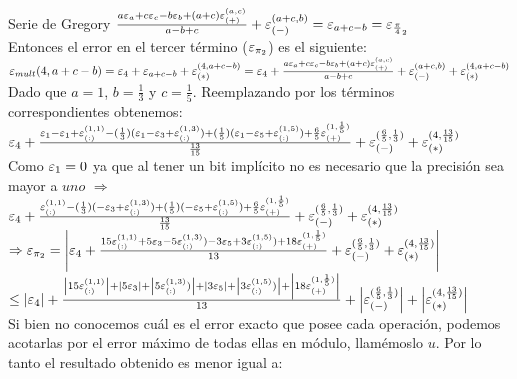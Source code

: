 \begin{subsubsection}{Serie de Gregory}
	$\frac{a\varepsilon _{a} + c\varepsilon _{c} - b\varepsilon _{b} + (a+c)\varepsilon _{({+})}^{({a,c})}}{a-b+c} + \varepsilon _{({-})}^{({a+c,b})} = \varepsilon _{a+c-b} = \varepsilon _{\frac{\pi}{4}_2}$\\
	
	Entonces el error en el tercer término ($\varepsilon _{\pi_2}$) es el siguiente:\\
	
	$\varepsilon _{mult}({4,a+c-b}) = \varepsilon _{4} + \varepsilon _{a+c-b} + \varepsilon _{({*})}^{({4,a+c-b})} = \varepsilon _{4} + \frac{a\varepsilon _{a} + c\varepsilon _{c} - b\varepsilon _{b} + (a+c)\varepsilon _{({+})}^{({a,c})}}{a-b+c} + \varepsilon _{({-})}^{({a+c,b})} + \varepsilon _{({*})}^{({4,a+c-b})}$\\
	
	Dado que $a=1$, $b=\frac{1}{3}$ y $c=\frac{1}{5}$. Reemplazando por los términos\\
	correspondientes obtenemos:\\
	
	$\varepsilon _{4} + \frac{\varepsilon _{1} - \varepsilon _{1} + \varepsilon _{({:})}^{({1,1})} - (\frac{1}{3})(\varepsilon _{1} - \varepsilon _{3} + \varepsilon _{({:})}^{({1,3})}) + (\frac{1}{5})(\varepsilon _{1} - \varepsilon _{5} + \varepsilon _{({:})}^{({1,5})}) + \frac{6}{5} \varepsilon _{({+})}^{({1,\frac{1}{5}})}}{\frac{13}{15}} + \varepsilon _{({-})}^{({\frac{6}{5},\frac{1}{3}})} + \varepsilon _{({*})}^{({4,\frac{13}{15}})}$\\
	
	Como $\varepsilon _{1}=0$ ya que al tener un bit implícito no es necesario que la precisión sea mayor a $uno$ $\Rightarrow$\\
	
	$\varepsilon _{4} + \frac{\varepsilon _{({:})}^{({1,1})} - (\frac{1}{3})(- \varepsilon _{3} + \varepsilon _{({:})}^{({1,3})}) + (\frac{1}{5})(- \varepsilon _{5} + \varepsilon _{({:})}^{({1,5})}) + \frac{6}{5} \varepsilon _{({+})}^{({1,\frac{1}{5}})}}{\frac{13}{15}} + \varepsilon _{({-})}^{({\frac{6}{5},\frac{1}{3}})} + \varepsilon _{({*})}^{({4,\frac{13}{15}})}$\\
	
	$\Rightarrow \varepsilon _{\pi_2} = \left| \varepsilon _{4} + \frac{15\varepsilon _{({:})}^{({1,1})} + 5\varepsilon _{3} - 5\varepsilon _{({:})}^{({1,3})}) - 3\varepsilon _{5} + 3\varepsilon _{({:})}^{({1,5})}) + 18\varepsilon _{({+})}^{({1,\frac{1}{5}})}}{13} + \varepsilon _{({-})}^{({\frac{6}{5},\frac{1}{3}})} + \varepsilon _{({*})}^{({4,\frac{13}{15}})} \right|$\\
	
	$\leq \left|\varepsilon _{4}\right| + \frac{ \left|15\varepsilon _{({:})}^{({1,1})}\right| + \left|5\varepsilon _{3}\right| + \left|5\varepsilon _{({:})}^{({1,3})})\right| + \left|3\varepsilon _{5}\right| + \left|3\varepsilon _{({:})}^{({1,5})})\right| + \left|18\varepsilon _{({+})}^{({1,\frac{1}{5}})}\right|}{13} + \left|\varepsilon _{({-})}^{({\frac{6}{5} ,\frac{1}{3}})}\right| + \left|\varepsilon _{({*})}^{({4,\frac{13}{15}})}\right|$\\
		
	Si bien no conocemos cuál es el error exacto que posee cada operación, podemos acotarlas por el error máximo de todas ellas en módulo, llamémoslo $u$. Por lo tanto el resultado obtenido es menor igual a:\\


\end{subsubsection}

